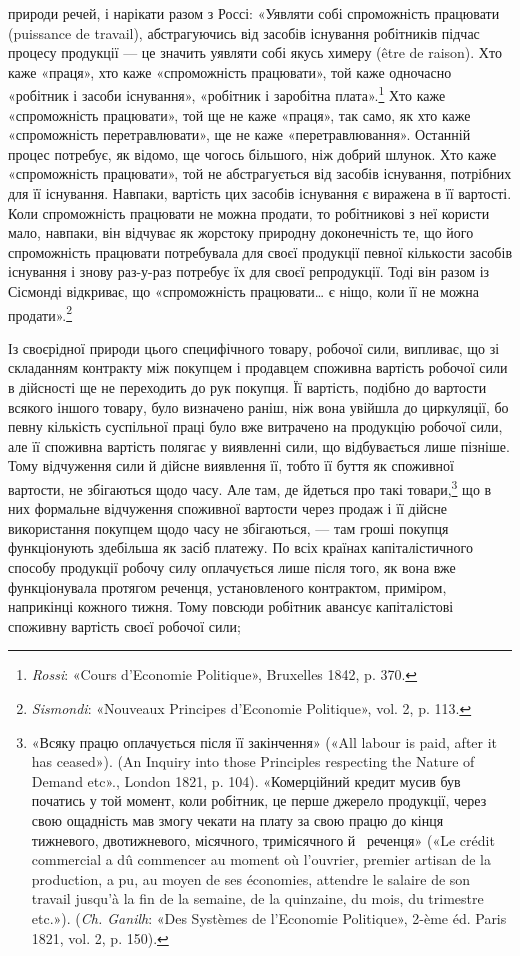 \parcont{}  %
природи речей, і нарікати разом з Россі: «Уявляти собі спроможність
працювати (puissance de travail), абстрагуючись від засобів
існування робітників підчас процесу продукції — це значить
уявляти собі якусь химеру (être de raison). Хто каже «праця»,
хто каже «спроможність працювати», той каже одночасно «робітник
і засоби існування», «робітник і заробітна плата».\footnote{
\emph{Rossi}: «Cours d’Economie Politique», Bruxelles 1842, p. 370.
} Хто каже «спроможність працювати», той ще не каже «праця», так
само, як хто каже «спроможність перетравлювати», ще не каже
«перетравлювання». Останній процес потребує, як відомо, ще
чогось більшого, ніж добрий шлунок. Хто каже «спроможність
працювати», той не абстрагується від засобів існування, потрібних
для її існування. Навпаки, вартість цих засобів існування
є виражена в її вартості. Коли спроможність працювати не можна
продати, то робітникові з неї користи мало, навпаки, він відчуває
як жорстоку природну доконечність те, що його спроможність
працювати потребувала для своєї продукції певної кількости засобів
існування і знову раз-у-раз потребує їх для своєї репродукції.
Тоді він разом із Сісмонді відкриває, що «спроможність
працювати\dots{} є ніщо, коли її не можна продати».\footnote{
\emph{Sismondi}: «Nouveaux Principes d’Economie Politique», vol. 2, p. 113.
}

Із своєрідної природи цього специфічного товару, робочої
сили, випливає, що зі складанням контракту між покупцем і
продавцем споживна вартість робочої сили в дійсності ще не
переходить до рук покупця. Її вартість, подібно до вартости
всякого іншого товару, було визначено раніш, ніж вона увійшла
до циркуляції, бо певну кількість суспільної праці було вже
витрачено на продукцію робочої сили, але її споживна вартість
полягає у виявленні сили, що відбувається лише пізніше. Тому
відчуження сили й дійсне виявлення її, тобто її буття як споживної
вартости, не збігаються щодо часу. Але там, де йдеться
про такі товари,\footnote{
«Всяку працю оплачується після її закінчення» («All labour is
paid, after it has ceased»). (An Inquiry into those Principles respecting
the Nature of Demand etc»., London 1821, p. 104). «Комерційний кредит
мусив був початись у той момент, коли робітник, це перше джерело продукції,
через свою ощадність мав змогу чекати на плату за свою працю
до кінця тижневого, двотижневого, місячного, тримісячного й~ реченця»
(«Le crédit commercial a dû commencer au moment où l’ouvrier,
premier artisan de la production, a pu, au moyen de ses économies, attendre
le salaire de son travail jusqu’à la fin de la semaine, de la quinzaine, du
mois, du trimestre etc.»). (\emph{Ch. Ganilh}: «Des Systèmes de l’Economie
Politique», 2-ème éd. Paris 1821, vol. 2, p. 150).
} що в них формальне відчуження споживної
вартости через продаж і її дійсне використання покупцем щодо
часу не збігаються, — там гроші покупця функціонують здебільша
як засіб платежу. По всіх країнах капіталістичного способу
продукції робочу силу оплачується лише після того, як вона
вже функціонувала протягом реченця, установленого контрактом,
приміром, наприкінці кожного тижня. Тому повсюди робітник
авансує капіталістові споживну вартість своєї робочої сили;
\parbreak{}  %
